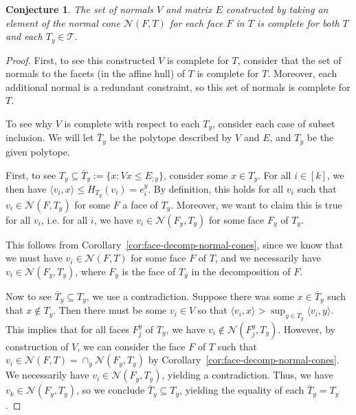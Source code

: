 \documentclass[12pt]{article}
\newcommand{\N}{\mathcal{N}}
\newcommand{\T}{\mathcal{T}}
\newcommand{\inprod}[2]{\langle #1, #2 \rangle}%
\newtheorem{conjecture}{Conjecture}
\begin{document}
  \begin{conjecture}
  	The set of normals $V$ and matrix $E$ constructed by taking an element of the normal cone $\N(F, T)$ for each face $F$ in $T$ is complete for both $T$ and each $T_y \in \T$.
  \end{conjecture}
  \begin{proof}
  	First, to see this constructed $V$ is complete for $T$, consider that the set of normals to the facets (in the affine hull) of $T$ is complete for $T$.
  	Moreover, each additional normal is a redundant constraint, so
  	this set of normals is complete for $T$.
  	
  	To see why $V$ is complete with respect to each $T_y$, consider each case of subset inclusion.
  	We will let $\bar T_y$ be the polytope described by $V$ and $E$, and $T_y$ be the given polytope.
  	
  	First,  to see $T_y \subseteq \bar T_y  := \{ x : Vx \leq E_{;y}\}$, consider some $x \in T_y$.
  	For all $i \in [k]$, we then have $\inprod{v_i}{x} \leq H_{T_y}(v_i) = e^y_i$.
  	By definition, this holds for all $v_i$ such that $v_i \in \N(F, T_y)$ for some $F$ a face of $T_y$.
  	Moreover, we want to claim this is true for all $v_i$, i.e. for all $i$, we have $v_i \in \N(F_y, T_y)$ for some face $F_y$ of $T_y$.
  	
  	This follows from Corollary~\ref{cor:face-decomp-normal-cones}, since we know that we must have $v_i \in \N(F, T)$ for some face $F$ of $T$, and we necessarily have $v_i \in \N(F_y, T_y)$, where $F_y$ is the face of $T_y$ in the decomposition of $F$.
  	
  	Now to see $\bar T_y \subseteq T_y$, we use a contradiction.
  	Suppose there was some $x \in \bar T_y$ such that $x \not \in T_y$.
  	Then there must be some $v_i \in V$ so that $\inprod {v_i}{x} > \sup_{y \in T_y} \inprod{v_i}{y}$.
  	This implies that for all faces $F_{j}^y$ of $T_y$, we have $v_i \not \in \N(F_{j}^y, T_y)$.
  	However, by construction of $V$, we can consider the face $F$ of $T$ such that $v_i \in \N(F,T) = \cap_y \N(F_y, T_y)$ by Corollary~\ref{cor:face-decomp-normal-cones}.
  	We necessarily have $v_i \in \N(F_y, T_y)$, yielding a contradiction.
  	Thus, we have $v_k \in \N(F_y, T_y)$, so we conclude $\bar T_y \subseteq T_y$, yielding the equality of each $\bar T_y = T_y$.
  \end{proof}
  
\end{document}

